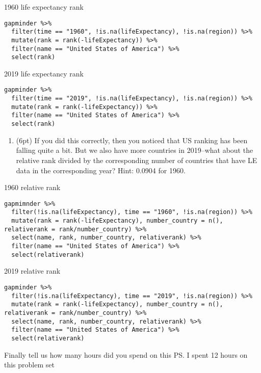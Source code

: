 \documentclass[]{article}
\providecommand{\tightlist}{%
  \setlength{\itemsep}{0pt}\setlength{\parskip}{0pt}}
\begin{document}
1960 life expectancy rank

\begin{verbatim}
gapminder %>% 
  filter(time == "1960", !is.na(lifeExpectancy), !is.na(region)) %>% 
  mutate(rank = rank(-lifeExpectancy)) %>% 
  filter(name == "United States of America") %>% 
  select(rank)
\end{verbatim}

2019 life expectancy rank

\begin{verbatim}
gapminder %>% 
  filter(time == "2019", !is.na(lifeExpectancy), !is.na(region)) %>% 
  mutate(rank = rank(-lifeExpectancy)) %>% 
  filter(name == "United States of America") %>% 
  select(rank)
\end{verbatim}

\begin{enumerate}
\def\labelenumi{\arabic{enumi}.}
\setcounter{enumi}{7}
\tightlist
\item
  (6pt) If you did this correctly, then you noticed that US ranking has
  been falling quite a bit. But we also have more countries in
  2019--what about the relative rank divided by the corresponding number
  of countries that have LE data in the corresponding year? Hint: 0.0904
  for 1960.
\end{enumerate}

1960 relative rank

\begin{verbatim}
gapmimnder %>% 
  filter(!is.na(lifeExpectancy), time == "1960", !is.na(region)) %>% 
  mutate(rank = rank(-lifeExpectancy), number_country = n(), relativerank = rank/number_country) %>% 
  select(name, rank, number_country, relativerank) %>% 
  filter(name == "United States of America") %>% 
  select(relativerank)
\end{verbatim}

2019 relative rank

\begin{verbatim}
gapminder %>% 
  filter(!is.na(lifeExpectancy), time == "2019", !is.na(region)) %>% 
  mutate(rank = rank(-lifeExpectancy), number_country = n(), relativerank = rank/number_country) %>% 
  select(name, rank, number_country, relativerank) %>% 
  filter(name == "United States of America") %>% 
  select(relativerank)
\end{verbatim}

Finally tell us how many hours did you spend on this PS. I spent 12
hours on this problem set
\end{document}
